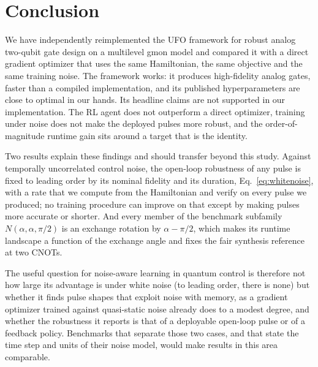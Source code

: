 \documentclass[aps,prx,twocolumn,superscriptaddress,nofootinbib,amsmath,amssymb,floatfix]{revtex4-2}
\newcommand{\Ntgt}[2]{N(#1,#1,#2)}
\begin{document}
\section{Conclusion}
\label{sec:conclusion}

We have independently reimplemented the UFO framework for robust analog two-qubit gate design on a
multilevel gmon model and compared it with a direct gradient optimizer that uses the same Hamiltonian, the
same objective and the same training noise. The framework works: it produces high-fidelity analog gates,
faster than a compiled implementation, and its published hyperparameters are close to optimal in our
hands. Its headline claims are not supported in our implementation. The RL agent does
not outperform a direct optimizer, training under noise does not make the deployed pulses more robust, and
the order-of-magnitude runtime gain sits around a target that is the identity.

Two results explain these findings and should transfer beyond this study. Against temporally uncorrelated
control noise, the open-loop robustness of any pulse is fixed to leading order by its nominal fidelity and
its duration, Eq.~\eqref{eq:whitenoise}, with a rate that we compute from the Hamiltonian and verify on
every pulse we produced; no training procedure can improve on that except by making pulses more accurate or
shorter. And every member of the benchmark subfamily $\Ntgt{\alpha}{\pi/2}$ is an exchange rotation by
$\alpha-\pi/2$, which makes its runtime landscape a function of the exchange angle and fixes the fair
synthesis reference at two CNOTs.

The useful question for noise-aware learning in quantum control is therefore not how large its advantage is
under white noise (to leading order, there is none) but whether it finds pulse shapes
that exploit noise with memory, as a gradient optimizer trained against quasi-static noise already does
to a modest degree, and whether the robustness it reports is that of a deployable open-loop
pulse or of a feedback policy. Benchmarks that separate those two cases, and that state the time step and
units of their noise model, would make results in this area comparable.

\end{document}
